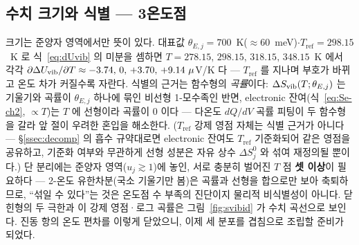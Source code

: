 \subsection{수치 크기와 식별 --- 3온도점}\label{ssec:einstein-numid}
크기는 준양자 영역에서만 뜻이 있다. 대표값 $\theta_{E,j}=700$~K($\approx60$~meV)$\cdot$$T_\mathrm{ref}=298.15$~K
로 식~\eqref{eq:dUvib} 의 미분을 셈하면 $T=278.15,\,298.15,\,318.15,\,348.15$~K 에서 각각 $\partial\Delta
U_{\mathrm{vib}}/\partial T\approx-3.74,\,0,\,+3.70,\,+9.14~\mu$V/K 다 --- $T_\mathrm{ref}$ 를 지나며 부호가 바뀌고 온도
차가 커질수록 자란다. 식별의 근거는 함수형의 \emph{곡률}이다: $\Delta S_{\mathrm{vib}}(T;\theta_{E,j})$ 는 기울기와
곡률이 $\theta_{E,j}$ 하나에 묶인 비선형 1-모수족인 반면, electronic 잔여(식~\eqref{eq:Se-ch2}, $\propto T$)는
$T$ 에 선형이라 곡률이 $0$ 이다 --- 다온도 $dQ/dV$ 곡률 피팅이 두 함수형을 갈라 앞 절이 우려한 혼입을
해소한다. ($T_\mathrm{ref}$ 강제 영점 자체는 식별 근거가 아니다 --- \S\ref{ssec:decomp} 의 흡수 규약대로면
electronic 잔여도 $T_\mathrm{ref}$ 기준화되어 같은 영점을 공유하고, 기준화 여부와 무관하게 선형 성분은 자유
상수 $\Delta S^0_j$ 와 섞여 재정의될 뿐이다.) 단 분리에는 준양자 영역($u_j\gtrsim1$)에 놓인, 서로 충분히 벌어진 $T$ 점
\textbf{셋 이상}이 필요하다 --- 2-온도 유한차분(국소 기울기만 봄)은 곡률과 선형을 합으로만 보아 축퇴하므로,
``섞일 수 있다''는 것은 온도점 수 부족의 진단이지 물리적 비식별성이 아니다. 닫힌형의 두 극한과 이 강제 영점·로그
곡률은 그림~\ref{fig:svibid} 가 수치 곡선으로 보인다. 진동 항의 온도 편차를 이렇게 닫았으니,
이제 세 분포를 겹침으로 조립할 준비가 되었다.

